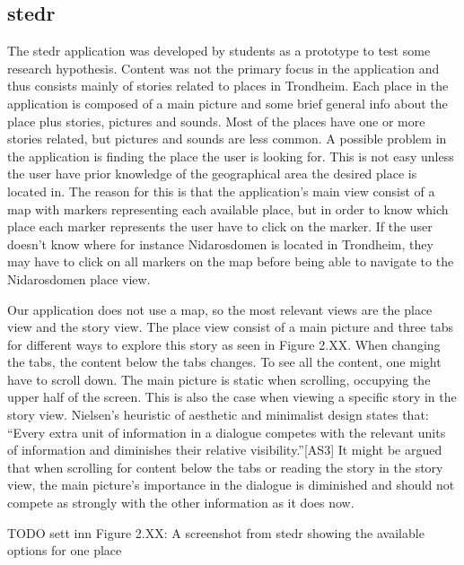 \subsection{stedr}

The stedr application was developed by students as a prototype to test some research hypothesis. Content was not the primary focus in the application and thus consists mainly of stories related to places in Trondheim. Each place in the application is composed of a main picture and some brief general info about the place plus stories, pictures and sounds. Most of the places have one or more stories related, but pictures and sounds are less common. A possible problem in the application is finding the place the user is looking for. This is not easy unless the user have prior knowledge of the geographical area the desired place is located in. The reason for this is that the application’s main view consist of a map with markers representing each available place, but in order to know which place each marker represents the user have to click on the marker. If the user doesn’t know where for instance Nidarosdomen is located in Trondheim, they may have to click on all markers on the map before being able to navigate to the Nidarosdomen place view. \newline

Our application does not use a map, so the most relevant views are the place view and the story view. The place view consist of a main picture and three tabs for different ways to explore this story as seen in Figure 2.XX. When changing the tabs, the content below the tabs changes. To see all the content, one might have to scroll down. The main picture is static when scrolling, occupying the upper half of the screen. This is also the case when viewing a specific story in the story view. Nielsen’s heuristic of aesthetic and minimalist design states that: “Every extra unit of information in a dialogue competes with the relevant units of information and diminishes their relative visibility.”[AS3] It might be argued that when scrolling for content below the tabs or reading the story in the story view, the main picture’s importance in the dialogue is diminished and should not compete as strongly with the other information as it does now. \newline

TODO sett inn Figure 2.XX: A screenshot from stedr showing the available options for one place


